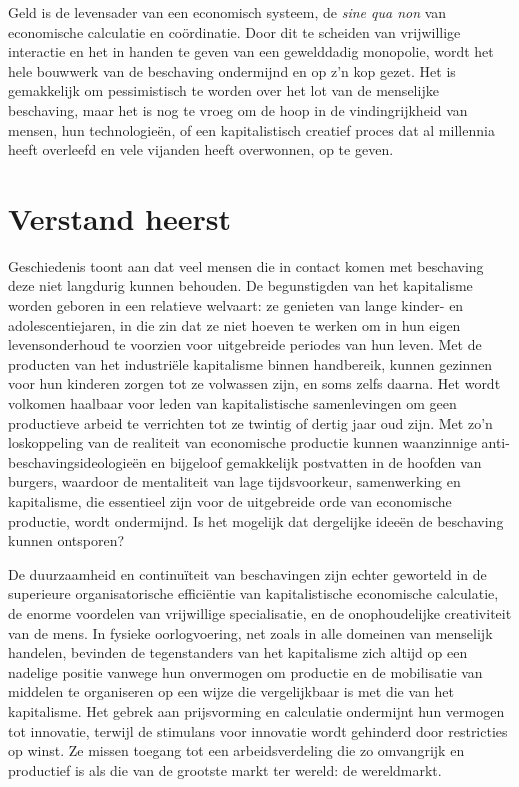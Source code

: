 Geld is de levensader van een economisch systeem, de \emph{sine qua non} van economische calculatie en coördinatie. Door dit te scheiden van vrijwillige interactie en het in handen te geven van een gewelddadig monopolie, wordt het hele bouwwerk van de beschaving ondermijnd en op z'n kop gezet. Het is gemakkelijk om pessimistisch te worden over het lot van de menselijke beschaving, maar het is nog te vroeg om de hoop in de vindingrijkheid van mensen, hun technologieën, of een kapitalistisch creatief proces dat al millennia heeft overleefd en vele vijanden heeft overwonnen, op te
geven.

\hypertarget{verstand-heerst}{%
\section{Verstand heerst}\label{verstand-heerst}}

Geschiedenis toont aan dat veel mensen die in contact komen met beschaving deze niet langdurig kunnen behouden.\autocite{226} De begunstigden van het kapitalisme worden geboren in een relatieve welvaart: ze genieten van lange kinder- en adolescentiejaren, in die zin dat ze niet hoeven te werken om in hun eigen levensonderhoud te voorzien voor uitgebreide periodes van hun leven. Met de producten van het industriële kapitalisme binnen handbereik, kunnen gezinnen voor hun kinderen zorgen tot ze volwassen zijn, en soms zelfs daarna. Het wordt volkomen haalbaar voor leden van kapitalistische samenlevingen om geen productieve arbeid te verrichten tot ze twintig of dertig jaar oud zijn. Met zo’n loskoppeling van de realiteit van economische productie kunnen waanzinnige anti-beschavingsideologieën en bijgeloof gemakkelijk postvatten in de hoofden van burgers, waardoor de mentaliteit van lage tijdsvoorkeur, samenwerking en kapitalisme, die essentieel zijn voor de uitgebreide orde van economische productie, wordt ondermijnd. Is het mogelijk dat dergelijke ideeën de beschaving kunnen ontsporen?

De duurzaamheid en continuïteit van beschavingen zijn echter geworteld in de superieure organisatorische efficiëntie van kapitalistische economische calculatie, de enorme voordelen van vrijwillige specialisatie, en de onophoudelijke creativiteit van de mens. In fysieke oorlogvoering, net zoals in alle domeinen van menselijk handelen, bevinden de tegenstanders van het kapitalisme zich altijd op een nadelige positie vanwege hun onvermogen om productie en de mobilisatie van middelen te organiseren op een wijze die vergelijkbaar is met die van het kapitalisme. Het gebrek aan prijsvorming en calculatie ondermijnt hun vermogen tot innovatie, terwijl de stimulans voor innovatie wordt gehinderd door restricties op winst. Ze missen toegang tot een arbeidsverdeling die zo omvangrijk en productief is als die van de grootste markt ter wereld: de wereldmarkt.

